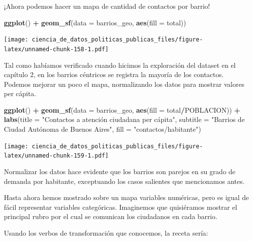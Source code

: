 \documentclass[]{book}
\newenvironment{Shaded}{\begin{snugshade}}{\end{snugshade}}
\newcommand{\KeywordTok}[1]{\textcolor[rgb]{0.13,0.29,0.53}{\textbf{#1}}}
\newcommand{\DataTypeTok}[1]{\textcolor[rgb]{0.13,0.29,0.53}{#1}}
\newcommand{\StringTok}[1]{\textcolor[rgb]{0.31,0.60,0.02}{#1}}
\newcommand{\OperatorTok}[1]{\textcolor[rgb]{0.81,0.36,0.00}{\textbf{#1}}}
\newcommand{\NormalTok}[1]{#1}
\begin{document}
¡Ahora podemos hacer un mapa de cantidad de contactos por barrio!

\begin{Shaded}
\begin{Highlighting}[]
\KeywordTok{ggplot}\NormalTok{() }\OperatorTok{+}\StringTok{ }\KeywordTok{geom_sf}\NormalTok{(}\DataTypeTok{data =}\NormalTok{ barrios_geo, }\KeywordTok{aes}\NormalTok{(}\DataTypeTok{fill =}\NormalTok{ total))}
\end{Highlighting}
\end{Shaded}

\texttt{[image: ciencia\_de\_datos\_politicas\_publicas\_files/figure-latex/unnamed-chunk-158-1.pdf]}

Tal como habíamos verificado cuando hicimos la exploración del dataset
en el capítulo 2, en los barrios céntricos se registra la mayoría de los
contactos. Podemos mejorar un poco el mapa, normalizando los datos para
mostrar valores per cápita.

\begin{Shaded}
\begin{Highlighting}[]
\KeywordTok{ggplot}\NormalTok{() }\OperatorTok{+}\StringTok{ }
\StringTok{    }\KeywordTok{geom_sf}\NormalTok{(}\DataTypeTok{data =}\NormalTok{ barrios_geo, }\KeywordTok{aes}\NormalTok{(}\DataTypeTok{fill =}\NormalTok{ total}\OperatorTok{/}\NormalTok{POBLACION)) }\OperatorTok{+}
\StringTok{    }\KeywordTok{labs}\NormalTok{(}\DataTypeTok{title =} \StringTok{"Contactos a atención ciudadana per cápita"}\NormalTok{,}
         \DataTypeTok{subtitle =} \StringTok{"Barrios de Ciudad Autónoma de Buenos Aires"}\NormalTok{,}
         \DataTypeTok{fill =} \StringTok{"contactos/habitante"}\NormalTok{)}
\end{Highlighting}
\end{Shaded}

\texttt{[image: ciencia\_de\_datos\_politicas\_publicas\_files/figure-latex/unnamed-chunk-159-1.pdf]}

Normalizar los datos hace evidente que los barrios son parejos en su
grado de demanda por habitante, exceptuando los casos salientes que
mencionamos antes.

Hasta ahora hemos mostrado sobre un mapa variables numéricas, pero es
igual de fácil representar variables categóricas. Imaginemos que
quisiéramos mostrar el principal rubro por el cual se comunican los
ciudadanos en cada barrio.

Usando los verbos de transformación que conocemos, la receta sería:
\end{document}
